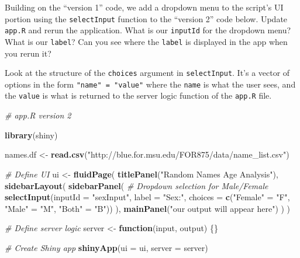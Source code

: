 \documentclass[]{krantz}
\makeatletter
\newenvironment{Shaded}{\begin{snugshade}}{\end{snugshade}}
\newcommand{\CommentTok}[1]{\textcolor[rgb]{0.37,0.37,0.37}{\textit{#1}}}
\newcommand{\ControlFlowTok}[1]{\textcolor[rgb]{0.27,0.27,0.27}{\textbf{#1}}}
\newcommand{\DataTypeTok}[1]{\textcolor[rgb]{0.27,0.27,0.27}{#1}}
\newcommand{\KeywordTok}[1]{\textcolor[rgb]{0.27,0.27,0.27}{\textbf{#1}}}
\newcommand{\NormalTok}[1]{#1}
\newcommand{\StringTok}[1]{\textcolor[rgb]{0.5,0.5,0.5}{#1}}
\newenvironment{kframe}{%
\medskip{}
\setlength{\fboxsep}{.8em}
 \def\at@end@of@kframe{}%
 \ifinner\ifhmode%
  \def\at@end@of@kframe{\end{minipage}}%
  \begin{minipage}{\columnwidth}%
 \fi\fi%
 \def\FrameCommand##1{\hskip\@totalleftmargin \hskip-\fboxsep
 \colorbox{shadecolor}{##1}\hskip-\fboxsep
     \hskip-\linewidth \hskip-\@totalleftmargin \hskip\columnwidth}%
 \MakeFramed {\advance\hsize-\width
   \@totalleftmargin\z@ \linewidth\hsize
   \@setminipage}}%
 {\par\unskip\endMakeFramed%
 \at@end@of@kframe}
\renewenvironment{Shaded}{\begin{kframe}}{\end{kframe}}
\makeatother
\begin{document}
Building on the ``version 1'' code, we add a dropdown menu to the script's UI portion using the \texttt{selectInput} function to the ``version 2'' code below. Update \texttt{app.R} and rerun the application. What is our \texttt{inputId} for the dropdown menu? What is our \texttt{label}? Can you see where the \texttt{label} is displayed in the app when you rerun it?

Look at the structure of the \texttt{choices} argument in \texttt{selectInput}. It's a vector of options in the form \texttt{"name"\ =\ "value"} where the \texttt{name} is what the user sees, and the \texttt{value} is what is returned to the server logic function of the \texttt{app.R} file.

\begin{Shaded}
\begin{Highlighting}[]
\CommentTok{# app.R version 2}

\KeywordTok{library}\NormalTok{(shiny)}

\NormalTok{names.df <-}\StringTok{ }\KeywordTok{read.csv}\NormalTok{(}\StringTok{"http://blue.for.msu.edu/FOR875/data/name_list.csv"}\NormalTok{)}

\CommentTok{# Define UI}
\NormalTok{ui <-}\StringTok{ }\KeywordTok{fluidPage}\NormalTok{(}
  \KeywordTok{titlePanel}\NormalTok{(}\StringTok{"Random Names Age Analysis"}\NormalTok{),}
  \KeywordTok{sidebarLayout}\NormalTok{(}
    \KeywordTok{sidebarPanel}\NormalTok{(}
      \CommentTok{# Dropdown selection for Male/Female}
      \KeywordTok{selectInput}\NormalTok{(}\DataTypeTok{inputId =} \StringTok{"sexInput"}\NormalTok{, }\DataTypeTok{label =} \StringTok{"Sex:"}\NormalTok{,}
                  \DataTypeTok{choices =} \KeywordTok{c}\NormalTok{(}\StringTok{"Female"}\NormalTok{ =}\StringTok{ "F"}\NormalTok{, }
                              \StringTok{"Male"}\NormalTok{ =}\StringTok{ "M"}\NormalTok{, }
                              \StringTok{"Both"}\NormalTok{ =}\StringTok{ "B"}\NormalTok{))}
\NormalTok{    ),}
    \KeywordTok{mainPanel}\NormalTok{(}\StringTok{"our output will appear here"}\NormalTok{)}
\NormalTok{  )}
\NormalTok{)}

\CommentTok{# Define server logic}
\NormalTok{server <-}\StringTok{ }\ControlFlowTok{function}\NormalTok{(input, output) \{\}}

\CommentTok{# Create Shiny app}
\KeywordTok{shinyApp}\NormalTok{(}\DataTypeTok{ui =}\NormalTok{ ui, }\DataTypeTok{server =}\NormalTok{ server)}
\end{Highlighting}
\end{Shaded}
\end{document}
